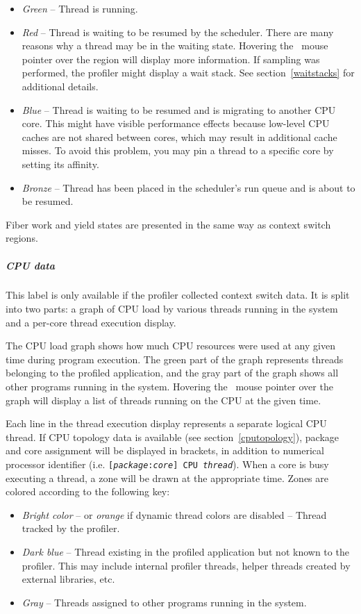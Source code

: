 \documentclass[hidelinks,titlepage,a4paper,twoside]{article}
\begin{document}
\begin{itemize}
\item \emph{Green} -- Thread is running.
\item \emph{Red} -- Thread is waiting to be resumed by the scheduler. There are many reasons why a thread may be in the waiting state. Hovering the \faArrowPointer{}~mouse pointer over the region will display more information. If sampling was performed, the profiler might display a wait stack. See section~\ref{waitstacks} for additional details.
\item \emph{Blue} -- Thread is waiting to be resumed and is migrating to another CPU core. This might have visible performance effects because low-level CPU caches are not shared between cores, which may result in additional cache misses. To avoid this problem, you may pin a thread to a specific core by setting its affinity.
\item \emph{Bronze} -- Thread has been placed in the scheduler's run queue and is about to be resumed.
\end{itemize}

Fiber work and yield states are presented in the same way as context switch regions.

\subparagraph{CPU data}

This label is only available if the profiler collected context switch data. It is split into two parts: a graph of CPU load by various threads running in the system and a per-core thread execution display.

The CPU load graph shows how much CPU resources were used at any given time during program execution. The green part of the graph represents threads belonging to the profiled application, and the gray part of the graph shows all other programs running in the system. Hovering the \faArrowPointer{}~mouse pointer over the graph will display a list of threads running on the CPU at the given time.

Each line in the thread execution display represents a separate logical CPU thread. If CPU topology data is available (see section~\ref{cputopology}), package and core assignment will be displayed in brackets, in addition to numerical processor identifier (i.e. \texttt{[\emph{package}:\emph{core}] CPU \emph{thread}}). When a core is busy executing a thread, a zone will be drawn at the appropriate time. Zones are colored according to the following key:

\begin{itemize}
\item \emph{Bright color} -- or \emph{orange} if dynamic thread colors are disabled -- Thread tracked by the profiler.
\item \emph{Dark blue} -- Thread existing in the profiled application but not known to the profiler. This may include internal profiler threads, helper threads created by external libraries, etc.
\item \emph{Gray} -- Threads assigned to other programs running in the system.
\end{itemize}
\end{document}
